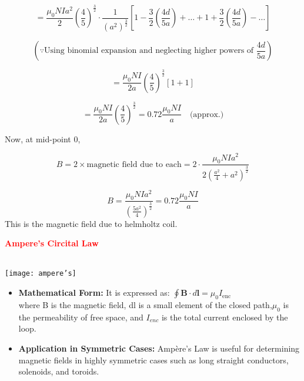 \documentclass{beamer}
\begin{document}
\begin{frame}

\[
= \frac{\mu_0 N I a^2}{2} \left( \frac{4}{5} \right)^{\frac{3}{2}} \cdot \frac{1}{(a^2)^{\frac{3}{2}}} \left[ 1 - \frac{3}{2} \left(\frac{4d}{5a}\right) + \dots + 1 + \frac{3}{2} \left(\frac{4d}{5a}\right) - \dots \right]
\]

\[
(\because \text{Using binomial expansion and neglecting higher powers of } \frac{4d}{5a})
\]

\[
= \frac{\mu_0 N I}{2a} \left( \frac{4}{5} \right)^{\frac{3}{2}} [1 + 1]
\]

\[
= \frac{\mu_0 N I}{2a} \left( \frac{4}{5} \right)^{\frac{3}{2}} = 0.72 \frac{\mu_0 N I}{a} \quad \text{(approx.)}
\]

Now, at mid-point 0,

\[
B = 2 \times \text{magnetic field due to each} = 2 \cdot \frac{\mu_0 N I a^2}{2 \left( \frac{a^2}{4} + a^2 \right)^{\frac{3}{2}}}
\]
\end{frame}

\begin{frame}

\[
B = \frac{\mu_0 N I a^2}{\left( \frac{5a^2}{4} \right)^{\frac{3}{2}}} = 0.72 \frac{\mu_0 N I}{a}
\]
This is the magnetic field due to helmholtz coil.
\end{frame}

\begin{frame}
\textcolor{red}{\textbf{Ampere's Circital Law}}\\
\\
\begin{center}
\texttt{[image: ampere's]}
\end{center}
\begin{itemize}
\item \textbf{Mathematical Form:} It is expressed as: $\oint \mathbf{B} \cdot d\mathbf{l} = \mu_0 I_{\text{enc}}$\\
where B is the magnetic field, dl is a small element of the closed path,$\mu_0$ is the permeability of free space, and $I_{enc}$ is the total current enclosed by the loop.
\item \textbf{Application in Symmetric Cases:} Ampère’s Law is useful for determining magnetic fields in highly symmetric cases such as long straight conductors, solenoids, and toroids.
\end{itemize}
\end{frame}
\end{document}
